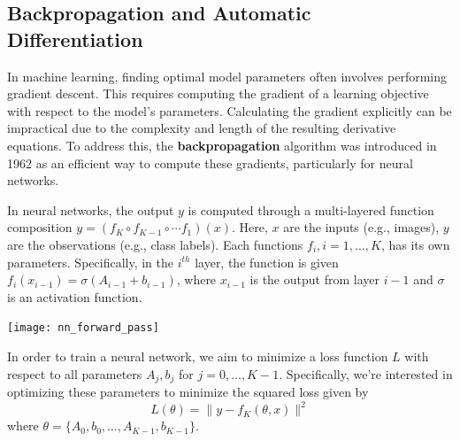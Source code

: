 \documentclass{article}
\begin{document}
\subsection{Backpropagation and Automatic Differentiation}
In machine learning, finding optimal model parameters often involves
performing gradient descent. This requires computing the gradient of a
learning objective with respect to the model's parameters. Calculating the
gradient explicitly can be impractical due to the complexity and length of the
resulting derivative equations. To address this, the \textbf{backpropagation} algorithm
was introduced in 1962 as an efficient way to compute these gradients,
particularly for neural networks.



In neural networks, the output $y$ is computed through a multi-layered
function composition $y=(f_K\circ f_{K-1}\circ \cdots f_1)(x)$. Here, $x$ are
the inputs (e.g., images), $y$ are the observations (e.g., class labels).
Each functions $f_i,i=1,\ldots,K$, has its own parameters.
Specifically, in the $i^{th}$ layer, the function is given
$f_i(x_{i-1})=\sigma(A_{i-1}+b_{i-1})$, where $x_{i-1}$ is
the output from layer $i-1$ and $\sigma$ is an activation function. 
\begin{center}
    \texttt{[image: nn\_forward\_pass]}
\end{center}
In order to train a neural network, we aim to minimize a loss function $L$
with respect to all parameters $A_j,b_j$ for $j=0,\ldots,K-1$.
Specifically, we're interested in optimizing these parameters to minimize the
squared loss given by
$$L(\theta)=\lVert y-f_K(\theta,x)\rVert^2$$
where $\theta=\{A_0, b_0, \ldots,A_{K-1},b_{K-1}\}$.
\end{document}

